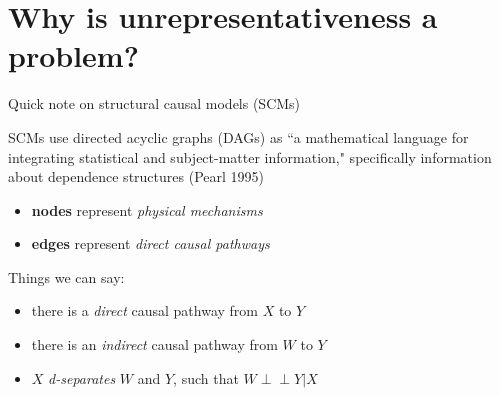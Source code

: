 \documentclass[
  ignorenonframetext,
]{beamer}
\providecommand{\tightlist}{%
  \setlength{\itemsep}{0pt}\setlength{\parskip}{0pt}}
\newcommand\ci{\perp\!\!\!\perp}
\begin{document}
\hypertarget{why-is-unrepresentativeness-a-problem}{%
\section{Why is unrepresentativeness a
problem?}\label{why-is-unrepresentativeness-a-problem}}

\begin{frame}{Quick note on structural causal models (SCMs)}
\protect\hypertarget{quick-note-on-structural-causal-models-scms}{}

SCMs use directed acyclic graphs (DAGs) as ``a mathematical language for
integrating statistical and subject-matter information," specifically
information about dependence structures (Pearl 1995)

\begin{itemize}
\tightlist
\item
  \textbf{nodes} represent \emph{physical mechanisms}
\item
  \textbf{edges} represent \emph{direct causal pathways}
\end{itemize}

\begin{figure}
\centering
{}
\end{figure}

Things we can say:

\begin{itemize}
\tightlist
\item
  there is a \emph{direct} causal pathway from \(X\) to \(Y\)
\item
  there is an \emph{indirect} causal pathway from \(W\) to \(Y\)
\item
  \(X\) \emph{d-separates} \(W\) and \(Y\), such that \(W \ci Y | X\)
\end{itemize}

\end{frame}
\end{document}
